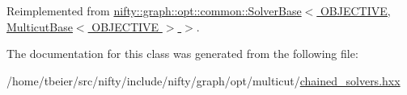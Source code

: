 Reimplemented from \hyperlink{classnifty_1_1graph_1_1opt_1_1common_1_1SolverBase_a6a5d77ee514c4b5f44d1908c1000f0ff}{nifty\+::graph\+::opt\+::common\+::\+Solver\+Base$<$ O\+B\+J\+E\+C\+T\+I\+V\+E, Multicut\+Base$<$ O\+B\+J\+E\+C\+T\+I\+V\+E $>$ $>$}.



The documentation for this class was generated from the following file\+:\begin{DoxyCompactItemize}
\item 
/home/tbeier/src/nifty/include/nifty/graph/opt/multicut/\hyperlink{multicut_2chained__solvers_8hxx}{chained\+\_\+solvers.\+hxx}\end{DoxyCompactItemize}
